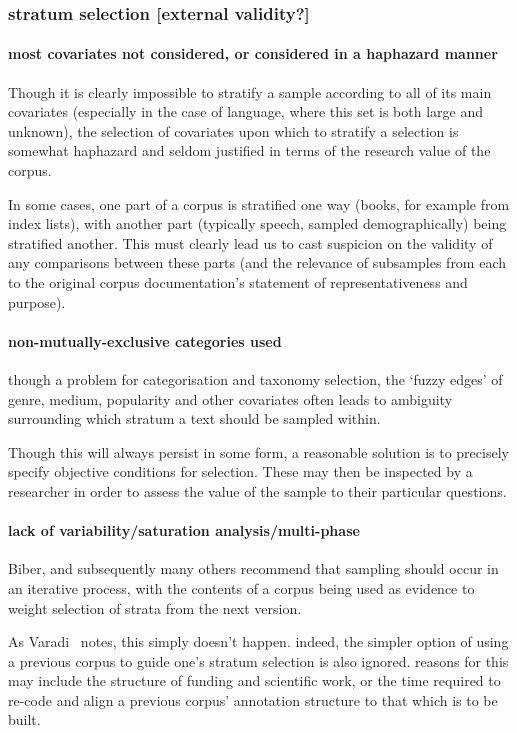 \subsubsection{stratum selection [external validity?]}

\paragraph{ most covariates not considered, or considered in a haphazard manner}
Though it is clearly impossible to stratify a sample according to all of its main covariates (especially in the case of language, where this set is both large and unknown), the selection of covariates upon which to stratify a selection is somewhat haphazard and seldom justified in terms of the research value of the corpus.

In some cases, one part of a corpus is stratified one way (books, for example from index lists), with another part (typically speech, sampled demographically) being stratified another. This must clearly lead us to cast suspicion on the validity of any comparisons between these parts (and the relevance of subsamples from each to the original corpus documentation's statement of representativeness and purpose).

\paragraph{ non-mutually-exclusive categories used}
though a problem for categorisation and taxonomy selection, the `fuzzy edges' of genre, medium, popularity and other covariates often leads to ambiguity surrounding which stratum a text should be sampled within.

Though this will always persist in some form, a reasonable solution is to precisely specify objective conditions for selection. These may then be inspected by a researcher in order to assess the value of the sample to their particular questions.


\paragraph{ lack of variability/saturation analysis/multi-phase}
Biber, and subsequently many others  recommend that sampling should occur in an iterative process, with the contents of a corpus being used as evidence to weight selection of strata from the next version.

As Varadi~\cite{varadi2000corpus}\cite{varadi2001linguistic} notes, this simply doesn't happen.  indeed, the simpler option of using a previous corpus to guide one's stratum selection is also ignored.  reasons for this may include the structure of funding and scientific work, or the time required to re-code and align a previous corpus' annotation structure to that which is to be built.  


